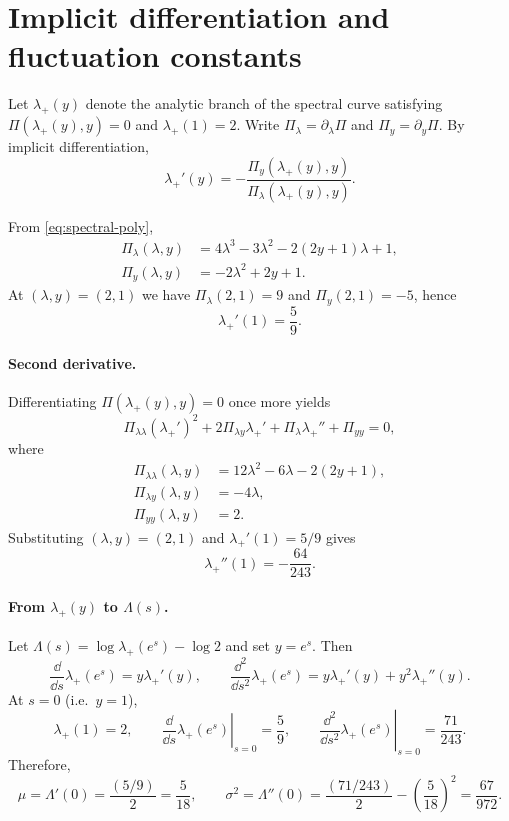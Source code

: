 \section{Implicit differentiation and fluctuation constants}\label{app:implicit}

Let \(\lambda_+(y)\) denote the analytic branch of the spectral curve satisfying
\(\Pi(\lambda_+(y),y)=0\) and \(\lambda_+(1)=2\).
Write \(\Pi_\lambda=\partial_\lambda \Pi\) and \(\Pi_y=\partial_y \Pi\).
By implicit differentiation,
\begin{equation}\label{eq:implicit-first}
\lambda_+'(y)=-\frac{\Pi_y(\lambda_+(y),y)}{\Pi_\lambda(\lambda_+(y),y)}.
\end{equation}

From \eqref{eq:spectral-poly},
\begin{align*}
\Pi_\lambda(\lambda,y) &= 4\lambda^3-3\lambda^2-2(2y+1)\lambda+1,\\
\Pi_y(\lambda,y) &= -2\lambda^2+2y+1.
\end{align*}
At \((\lambda,y)=(2,1)\) we have \(\Pi_\lambda(2,1)=9\) and \(\Pi_y(2,1)=-5\), hence
\[
\lambda_+'(1)=\frac{5}{9}.
\]

\paragraph{Second derivative.}
Differentiating \(\Pi(\lambda_+(y),y)=0\) once more yields
\[
\Pi_{\lambda\lambda}(\lambda_+')^2+2\Pi_{\lambda y}\lambda_+'+\Pi_\lambda\lambda_+''+\Pi_{yy}=0,
\]
where
\begin{align*}
\Pi_{\lambda\lambda}(\lambda,y) &= 12\lambda^2-6\lambda-2(2y+1),\\
\Pi_{\lambda y}(\lambda,y) &= -4\lambda,\\
\Pi_{yy}(\lambda,y) &= 2.
\end{align*}
Substituting \((\lambda,y)=(2,1)\) and \(\lambda_+'(1)=5/9\) gives
\[
\lambda_+''(1)=-\frac{64}{243}.
\]

\paragraph{From \(\lambda_+(y)\) to \(\Lambda(s)\).}
Let \(\Lambda(s)=\log \lambda_+(e^s)-\log 2\) and set \(y=e^s\).
Then
\[
\frac{\dd}{\dd s}\lambda_+(e^s)=y\lambda_+'(y),
\qquad
\frac{\dd^2}{\dd s^2}\lambda_+(e^s)=y\lambda_+'(y)+y^2\lambda_+''(y).
\]
At \(s=0\) (i.e.\ \(y=1\)),
\[
\lambda_+(1)=2,\qquad
\left.\frac{\dd}{\dd s}\lambda_+(e^s)\right|_{s=0}=\frac{5}{9},\qquad
\left.\frac{\dd^2}{\dd s^2}\lambda_+(e^s)\right|_{s=0}=\frac{71}{243}.
\]
Therefore,
\[
\mu=\Lambda'(0)=\frac{(5/9)}{2}=\frac{5}{18},
\qquad
\sigma^2=\Lambda''(0)=\frac{(71/243)}{2}-\left(\frac{5}{18}\right)^2=\frac{67}{972}.
\]

